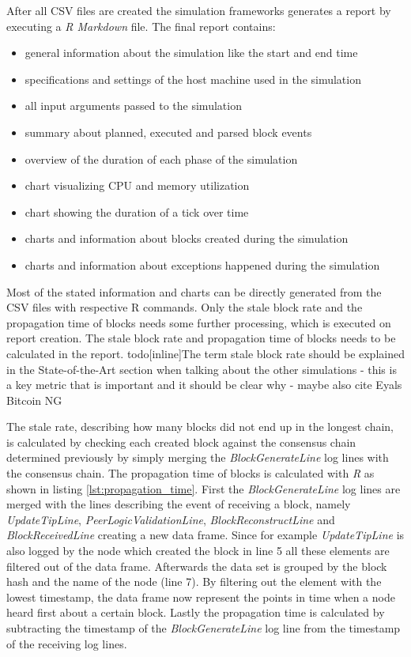 After all CSV files are created the simulation frameworks generates a report by executing a \textit{R Markdown} file.
The final report contains:
\begin{itemize}
	\item general information about the simulation like the start and end time
	\item specifications and settings of the host machine used in the simulation
	\item all input arguments passed to the simulation
	\item summary about planned, executed and parsed block events
	\item overview of the duration of each phase of the simulation
	\item chart visualizing CPU and memory utilization
	\item chart showing the duration of a tick over time
	\item charts and information about blocks created during the simulation
	\item charts and information about exceptions happened during the simulation
\end{itemize}

Most of the stated information and charts can be directly generated from the CSV files with respective R commands.
Only the stale block rate and the propagation time of blocks needs some further processing, which is executed on report creation.
The stale block rate and propagation time of blocks needs to be calculated in the report.
todo[inline]{The term stale block rate should be explained in the State-of-the-Art section when talking about the other simulations - this is a key metric that is important and it should be clear why - maybe also cite Eyals Bitcoin NG}

The stale rate, describing how many blocks did not end up in the longest chain, is calculated by checking each created block against the consensus chain determined previously by simply merging the \textit{BlockGenerateLine} log lines with the consensus chain.
The propagation time of blocks is calculated with \textit{R} as shown in listing \ref{lst:propagation_time}.
First the \textit{BlockGenerateLine} log lines are merged with the lines describing the event of receiving a block, namely	\textit{UpdateTipLine}, \textit{PeerLogicValidationLine}, \textit{BlockReconstructLine} and \textit{BlockReceivedLine} creating a new data frame.
Since for example \textit{UpdateTipLine} is also logged by the node which created the block in line 5 all these elements are filtered out of the data frame.
Afterwards the data set is grouped by the block hash and the name of the node (line 7).
By filtering out the element with the lowest timestamp, the data frame now represent the points in time when a node heard first about a certain block.
Lastly the propagation time is calculated by subtracting the timestamp of the \textit{BlockGenerateLine} log line from the timestamp of the receiving log lines.

